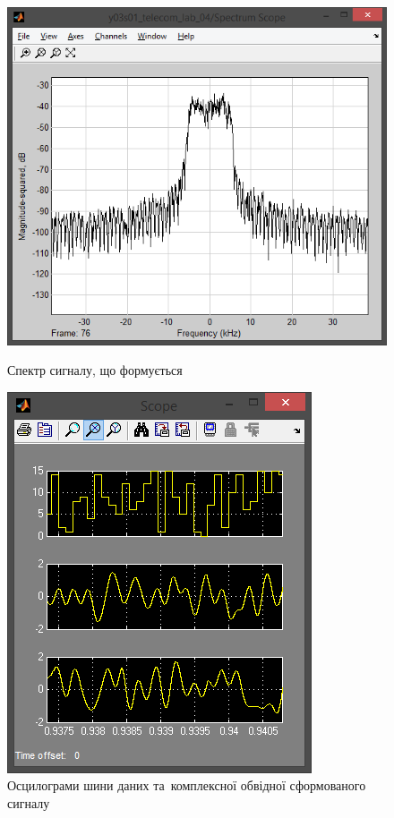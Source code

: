 \documentclass[
	a4paper,
	oneside,
	BCOR = 10mm,
	DIV = 12,
	12pt,
	headings = normal,
]{scrartcl}
\begin{document}
				\begin{figure}[!htbp]
					\begin{minipage}[t]{0.5\textwidth - 0.5em}
						\centering
						\includegraphics[height = 8\baselineskip]{../01-solution/rolloff-0p2-spectrum-scope.png}
						\caption{Спектр сигналу, що формується}
						\label{fig:rolloff-0p2-spectrum-scope}
					\end{minipage}\hspace{1em}%
					\begin{minipage}[t]{0.5\textwidth - 0.5em}
						\centering
						\includegraphics[height = 8\baselineskip]{../01-solution/rolloff-0p2-scope.png}
						\caption{Осцилограми шини даних та~комплексної обвідної сформованого сигналу}
						\label{fig:rolloff-0p2-scope}
					\end{minipage}%
				\end{figure}
\end{document}
